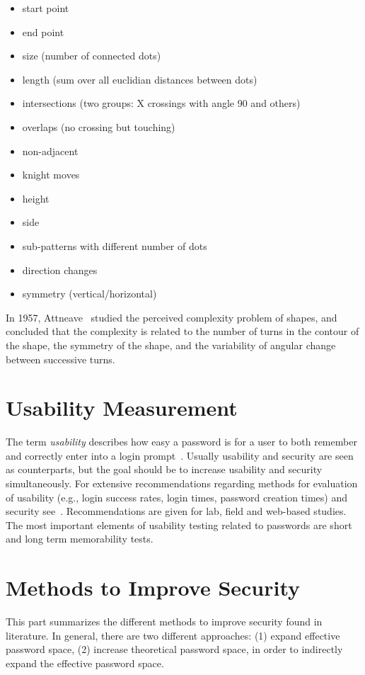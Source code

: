 \documentclass[twocolumn, a4paper, 10pt]{article}
\begin{document}
\begin{itemize}
	\setlength\itemsep{0em}
	\item start point
	\item end point
	\item size (number of connected dots)
	\item length (sum over all euclidian distances between dots)
	\item intersections (two groups: X crossings with angle 90 and others)
	\item overlaps (no crossing but touching)
	\item non-adjacent
	\item knight moves
	\item height
	\item side
	\item sub-patterns with different number of dots
	\item direction changes
	\item symmetry (vertical/horizontal)
\end{itemize}

In 1957, Attneave~\cite{attneave1957physical} studied the perceived complexity problem of shapes, and concluded that the complexity is related to the number of turns in the contour of the shape, the symmetry of the shape, and the variability of angular change between successive turns.


\section{Usability Measurement}
\label{sec:usability}

The term \emph{usability} describes how easy a password is for a user to both remember and correctly enter into a login prompt~\cite{Keith200717}. Usually usability and security are seen as counterparts, but the goal should be to increase usability and security simultaneously. For extensive recommendations regarding methods for evaluation of usability (e.g., login success rates, login times, password creation times) and security see~\cite{Biddle:2012:GPL:2333112.2333114}. Recommendations are given for lab, field and web-based studies. The most important elements of usability testing related to passwords are short and long term memorability tests.

\section {Methods to Improve Security}
\label{sec:improve}
This part summarizes the different methods to improve security found in literature. In general, there are two different approaches: (1) expand effective password space, (2) increase theoretical password space, in order to indirectly expand the effective password space. 
\end{document}
